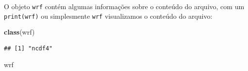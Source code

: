 \documentclass[]{book}
\newenvironment{Shaded}{\begin{snugshade}}{\end{snugshade}}
\newcommand{\KeywordTok}[1]{\textcolor[rgb]{0.13,0.29,0.53}{\textbf{#1}}}
\newcommand{\NormalTok}[1]{#1}
\begin{document}
O objeto \texttt{wrf} contém algumas informações sobre o conteúdo do
arquivo, com um \texttt{print(wrf)} ou simplesmente \texttt{wrf}
visualizamos o conteúdo do arquivo:

\begin{Shaded}
\begin{Highlighting}[]
\KeywordTok{class}\NormalTok{(wrf)}
\end{Highlighting}
\end{Shaded}

\begin{verbatim}
## [1] "ncdf4"
\end{verbatim}

\begin{Shaded}
\begin{Highlighting}[]
\NormalTok{wrf}
\end{Highlighting}
\end{Shaded}
\end{document}
